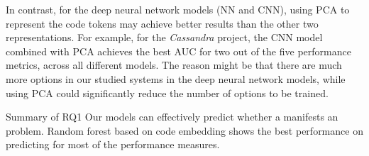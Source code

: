 In contrast, for the deep neural network models (NN and CNN), using PCA to represent the code tokens may achieve better results than the other two representations. For example, for the \emph{Cassandra} project, the CNN model combined with PCA achieves the best AUC for two out of the five performance metrics, across all different models.
The reason might be that there are much more options in our studied systems %
in the deep neural network models, while using PCA could significantly reduce the number of options to be trained.





\vspace{0.5cm}
\begin{Summary}{Summary of RQ1}{}
Our models can effectively predict whether a \instance manifests an \inconsistent problem. Random forest based on code embedding shows the best performance on predicting \inconsistent for most of the performance measures.
\end{Summary}


